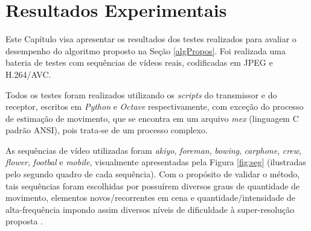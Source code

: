 \chapter[Resultados Experimentais]{Resultados Experimentais}

Este Capítulo visa apresentar os resultados dos testes realizados para avaliar o desempenho do algoritmo proposto na Seção \ref{algPropos}. Foi realizada uma bateria de testes com sequências de vídeos reais, codificadas em JPEG e H.264/AVC. 

Todos os testes foram realizados utilizando os \textit{scripts} do transmissor e do receptor, escritos em \textit{Python} e \textit{Octave} respectivamente, com exceção do processo de estimação de movimento, que se encontra em um arquivo \textit{mex} (linguagem C padrão ANSI), pois trata-se de um processo complexo.

As sequências de vídeo utilizadas foram \textit{akiyo}, \textit{foreman}, \textit{bowing}, \textit{carphone}, \textit{crew}, \textit{flower}, \textit{footbal} e  \textit{mobile}, visualmente apresentadas pela Figura \ref{fig:seg} (ilustradas pelo segundo quadro de cada sequência). Com o propósito de validar o método, tais sequências foram escolhidas por possuírem diversos graus de quantidade de movimento, elementos novos/recorrentes em cena e quantidade/intensidade de alta-frequência impondo assim diversos níveis de dificuldade à super-resolução proposta \cite{silva2009super}.

